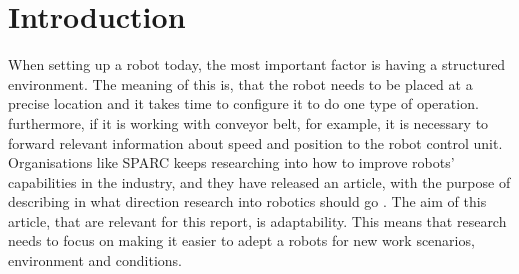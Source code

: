 \chapter{Introduction}\label{sec_introduction}
When setting up a robot today, the most important factor is having a structured environment. The meaning of this is, that the robot needs to be placed at a precise location and it takes time to configure it to do one type of operation. furthermore, if it is working with conveyor belt, for example, it is necessary to forward relevant information about speed and position to the robot control unit. Organisations like SPARC keeps researching into how to improve robots' capabilities in the industry, and they have released an article, with the purpose of describing in what direction research into robotics should go \citep[p. 190]{mar_sra}. The aim of this article, that are relevant for this report, is adaptability. This means that research needs to focus on making it easier to adept a robots for new work scenarios, environment and conditions. 

